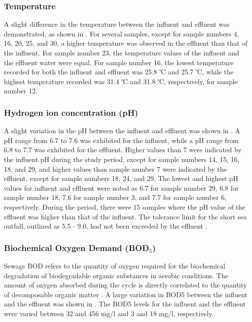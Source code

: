 

\subsubsection{Temperature}
A slight difference in the temperature between the influent and effluent was demonstrated, as shown in . For several samples, except for sample numbers 4, 16, 20, 25, and 30, a higher temperature was observed in the effluent than that of the influent. For sample number 23, the temperature values of the influent and the effluent water were equal. For sample number 16, the lowest temperature recorded for both the influent and effluent was 25.8 ℃ and 25.7 ℃, while the highest temperature recorded was 31.4 ℃ and 31.8 ℃, respectively, for sample number 12.



\subsubsection{Hydrogen ion concentration (pH)}
A slight variation in the pH between the influent and effluent was shown in . A pH range from 6.7 to 7.6 was exhibited for the influent, while a pH range from 6.8 to 7.7 was exhibited for the effluent. 
Higher values than 7 were indicated by the influent pH during the study period, except for sample numbers 14, 15, 16, 18, and 29, and higher values than sample number 7 were indicated by the effluent, except for sample numbers 18, 24, and 29. The lowest and highest pH values for influent and effluent were noted as 6.7 for sample number 29, 6.8 for sample number 18, 7.6 for sample number 3, and 7.7 for sample number 6, respectively. During the period, there were 15 samples where the pH value of the effluent was higher than that of the influent. The tolerance limit for the short sea outfall, outlined as 5.5 - 9.0, had not been exceeded by the effluent \cite{CEA2022}.




\subsubsection{Biochemical Oxygen Demand (BOD$_5$)}
Sewage \ac{BOD} refers to the quantity of oxygen required for the biochemical degradation of biodegradable organic substances in aerobic conditions. The amount of oxygen absorbed during the cycle is directly correlated to the quantity of decomposable organic matter \cite{Prasad2020}. A large variation in \ac{BOD5} between the influent and the effluent was shown in . The \ac{BOD5} levels for the influent and the effluent were varied between 32 and 456 mg/l and 3 and 18 mg/l, respectively. 

